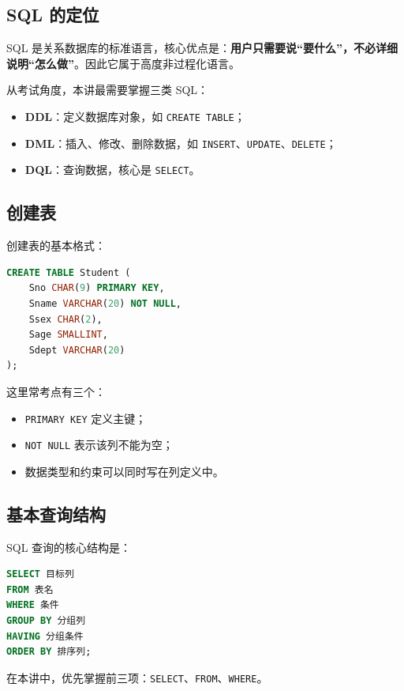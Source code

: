 \documentclass{../../note}
\begin{document}
\subsection{SQL 的定位}

SQL 是关系数据库的标准语言，核心优点是：\textbf{用户只需要说“要什么”，不必详细说明“怎么做”}。因此它属于高度非过程化语言。

从考试角度，本讲最需要掌握三类 SQL：

\begin{itemize}
  \item \textbf{DDL}：定义数据库对象，如 \texttt{CREATE TABLE}；
  \item \textbf{DML}：插入、修改、删除数据，如 \texttt{INSERT}、\texttt{UPDATE}、\texttt{DELETE}；
  \item \textbf{DQL}：查询数据，核心是 \texttt{SELECT}。
\end{itemize}

\subsection{创建表}

创建表的基本格式：

\begin{lstlisting}[language=SQL]
CREATE TABLE Student (
    Sno CHAR(9) PRIMARY KEY,
    Sname VARCHAR(20) NOT NULL,
    Ssex CHAR(2),
    Sage SMALLINT,
    Sdept VARCHAR(20)
);
\end{lstlisting}

这里常考点有三个：

\begin{itemize}
  \item \texttt{PRIMARY KEY} 定义主键；
  \item \texttt{NOT NULL} 表示该列不能为空；
  \item 数据类型和约束可以同时写在列定义中。
\end{itemize}

\subsection{基本查询结构}

SQL 查询的核心结构是：

\begin{lstlisting}[language=SQL]
SELECT 目标列
FROM 表名
WHERE 条件
GROUP BY 分组列
HAVING 分组条件
ORDER BY 排序列;
\end{lstlisting}

在本讲中，优先掌握前三项：\texttt{SELECT}、\texttt{FROM}、\texttt{WHERE}。
\end{document}
